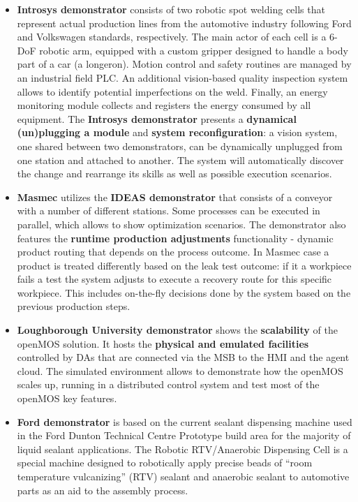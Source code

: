 \begin{itemize}
	\item \textbf{Introsys demonstrator} consists of two robotic spot welding cells that represent actual production lines from the automotive industry following Ford and Volkswagen standards, respectively. 
	The main actor of each cell is a 6-DoF robotic arm, equipped with a custom gripper designed to handle a body part of a car (a longeron). 
	Motion control and safety routines are managed by an industrial field PLC. 
	An additional vision-based quality inspection system allows to identify potential imperfections on the weld. 
	Finally, an energy monitoring module collects and registers the energy consumed by all equipment.
	The \textbf{Introsys demonstrator} presents a \textbf{dynamical (un)plugging a module} and \textbf{system reconfiguration}: a vision system, one shared between two demonstrators, can be dynamically unplugged from one station and attached to another.
	The system will automatically discover the change and rearrange its skills as well as possible execution scenarios.
	\item \textbf{Masmec} utilizes the \textbf{IDEAS demonstrator} that consists of a conveyor with a number of different stations. 
	Some processes can be executed in parallel, which allows to show optimization scenarios. 
	The demonstrator also features the \textbf{runtime production adjustments} functionality - dynamic product routing that depends on the process outcome.
	In Masmec case a product is treated differently based on the leak test outcome: if it a workpiece fails a test the system adjusts to execute a recovery route for this specific workpiece.
	This includes on-the-fly decisions done by the system based on the previous production steps. 
	\item \textbf{Loughborough University demonstrator} shows  the \textbf{scalability} of the \gls{openMOS} solution. 
	It hosts the \textbf{physical and emulated facilities} controlled by \glspl{DA} that are connected via the \gls{MSB} to the \gls{HMI} and the agent cloud. 
	The simulated environment allows to demonstrate how the \gls{openMOS} scales up, running in a distributed control system and test most of the \gls{openMOS} key features.
	\item \textbf{Ford demonstrator} is based on the current sealant dispensing machine used in	the Ford Dunton Technical Centre Prototype build area for the majority of liquid sealant applications.
	The Robotic RTV/Anaerobic Dispensing Cell is a special machine designed to robotically apply precise beads of “room temperature vulcanizing” (RTV) sealant and anaerobic sealant to automotive parts as an aid to the assembly process.

\end{itemize}
